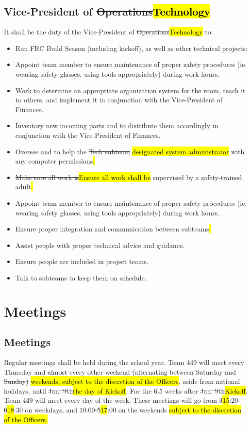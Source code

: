 \documentclass[12pt, a4paper]{article}
\begin{document}
\subsection{Vice-President of \protect \st{Operations}\hl{Technology}}
It shall be the duty of the Vice-President of \st{Operations}\hl{Technology} to:
\begin{itemize}
\item Run FRC Build Season (including kickoff), as well as other technical projects:
\item Appoint team member to ensure maintenance of proper safety procedures (ie. wearing safety glasses, using tools appropriately) during work hours.


\item Work to determine an appropriate organization system for the room, teach it to others, and implement it in conjunction with the Vice-President of Finances.
\item Inventory new incoming parts and to distribute them accordingly in conjunction with the Vice-President of Finances.
\item Oversee and to help the \st{Tech subteam} \hl{designated system administrator} with any computer permissions\hl{.}
\item \st{Make sure all work is}\hl{Ensure all work shall be} supervised by a safety-trained adult\hl{.}
\item Appoint team member to ensure maintenance of proper safety procedures (ie. wearing safety glasses, using tools appropriately) during work hours.
\item Ensure proper integration and communication between subteams\hl{.}
\item Assist people with proper technical advice and guidance.
\item Ensure people are included in project teams.
\item Talk to subteams to keep them on schedule.
\end{itemize}
\section{Meetings}
\subsection{Meetings}
Regular meetings shall be held during the school year. 
Team 449 will meet every Thursday and \st{almost every other weekend (alternating between Saturday and Sunday)} \hl{weekends, subject to the discretion of the Officers}, aside from national holidays, until \st{Jan. 9th}\hl{the day of Kickoff}. 
For the 6.5 weeks after \st{Jan. 9th}\hl{Kickoff},  Team 449 will meet every day of the week.  
These meetings will go from \st{3}\hl{15}:20-\st{6}\hl{18}:30 on weekdays, and 10:00-\st{5}\hl{17}:00 on the weekends\hl{ subject to the discretion of the Officers.}
\end{document}
